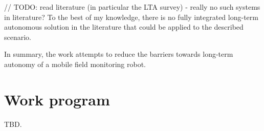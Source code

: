 \documentclass[german, master, expose, latin1]{base/thesis_KBS}
\begin{document}
// TODO: read literature (in particular the LTA survey) - really no such systems in literature?\newline
To the best of my knowledge, there is no fully integrated long-term autonomous solution in the literature that could be applied to the described scenario.\newline

In summary, the work attempts to reduce the barriers towards long-term autonomy of a mobile field monitoring robot.

\section{Work program}

TBD.


\end{document}
